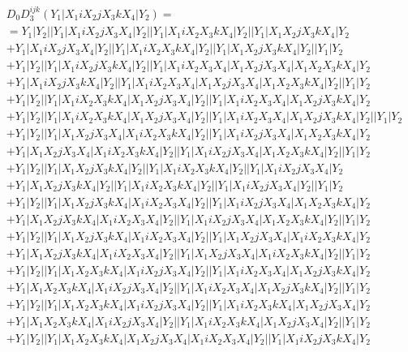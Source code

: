 \documentclass{article}[12pt]
\begin{document}
 
\begin{align*}
& D_0 D_3^{ijk}(Y_1|X_1iX_2jX_3kX_4|Y_2) =\\
& = Y_1|Y_2||Y_1|X_1iX_2jX_3X_4|Y_2||Y_1|X_1iX_2X_3kX_4|Y_2||Y_1|X_1X_2jX_3kX_4|Y_2\\ 
& + Y_1|X_1iX_2jX_3X_4|Y_2||Y_1|X_1iX_2X_3kX_4|Y_2||Y_1|X_1X_2jX_3kX_4|Y_2||Y_1|Y_2\\ 
 & + Y_1|Y_2||Y_1|X_1iX_2jX_3kX_4|Y_2||Y_1|X_1iX_2X_3X_4|X_1X_2jX_3X_4|X_1X_2X_3kX_4|Y_2\\ 
 & + Y_1|X_1iX_2jX_3kX_4|Y_2||Y_1|X_1iX_2X_3X_4|X_1X_2jX_3X_4|X_1X_2X_3kX_4|Y_2||Y_1|Y_2\\ 
 & + Y_1|Y_2||Y_1|X_1iX_2X_3kX_4|X_1X_2jX_3X_4|Y_2||Y_1|X_1iX_2X_3X_4|X_1X_2jX_3kX_4|Y_2\\
  & + Y_1|Y_2||Y_1|X_1iX_2X_3kX_4|X_1X_2jX_3X_4|Y_2||Y_1|X_1iX_2X_3X_4|X_1X_2jX_3kX_4|Y_2||Y_1|Y_2\\  
  & + Y_1|Y_2||Y_1|X_1X_2jX_3X_4|X_1iX_2X_3kX_4|Y_2||Y_1|X_1iX_2jX_3X_4|X_1X_2X_3kX_4|Y_2\\
   & + Y_1|X_1X_2jX_3X_4|X_1iX_2X_3kX_4|Y_2||Y_1|X_1iX_2jX_3X_4|X_1X_2X_3kX_4|Y_2||Y_1|Y_2\\ 
 & + Y_1|Y_2||Y_1|X_1X_2jX_3kX_4|Y_2||Y_1|X_1iX_2X_3kX_4|Y_2||Y_1|X_1iX_2jX_3X_4|Y_2\\
  & + Y_1|X_1X_2jX_3kX_4|Y_2||Y_1|X_1iX_2X_3kX_4|Y_2||Y_1|X_1iX_2jX_3X_4|Y_2||Y_1|Y_2\\ 
 & + Y_1|Y_2||Y_1|X_1X_2jX_3kX_4|X_1iX_2X_3X_4|Y_2||Y_1|X_1iX_2jX_3X_4|X_1X_2X_3kX_4|Y_2\\ 
  & + Y_1|X_1X_2jX_3kX_4|X_1iX_2X_3X_4|Y_2||Y_1|X_1iX_2jX_3X_4|X_1X_2X_3kX_4|Y_2||Y_1|Y_2\\ 
 & + Y_1|Y_2||Y_1|X_1X_2jX_3kX_4|X_1iX_2X_3X_4|Y_2||Y_1|X_1X_2jX_3X_4|X_1iX_2X_3kX_4|Y_2\\ 
  & + Y_1|X_1X_2jX_3kX_4|X_1iX_2X_3X_4|Y_2||Y_1|X_1X_2jX_3X_4|X_1iX_2X_3kX_4|Y_2||Y_1|Y_2\\ 
 & + Y_1|Y_2||Y_1|X_1X_2X_3kX_4|X_1iX_2jX_3X_4|Y_2||Y_1|X_1iX_2X_3X_4|X_1X_2jX_3kX_4|Y_2\\ 
  & + Y_1|X_1X_2X_3kX_4|X_1iX_2jX_3X_4|Y_2||Y_1|X_1iX_2X_3X_4|X_1X_2jX_3kX_4|Y_2||Y_1|Y_2\\
 & + Y_1|Y_2||Y_1|X_1X_2X_3kX_4|X_1iX_2jX_3X_4|Y_2||Y_1|X_1iX_2X_3kX_4|X_1X_2jX_3X_4|Y_2\\ 
  & + Y_1|X_1X_2X_3kX_4|X_1iX_2jX_3X_4|Y_2||Y_1|X_1iX_2X_3kX_4|X_1X_2jX_3X_4|Y_2||Y_1|Y_2\\ 
  & + Y_1|Y_2||Y_1|X_1X_2X_3kX_4|X_1X_2jX_3X_4|X_1iX_2X_3X_4|Y_2||Y_1|X_1iX_2jX_3kX_4|Y_2\\ 

\end{align*}
\end{document}
